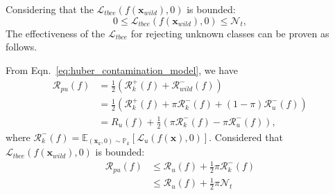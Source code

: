 
Considering that the $\mathcal{L}_{tbce}(f(\boldsymbol{x}_{wild}),0)$ is bounded:
\begin{equation}
    0 \leq \mathcal{L}_{tbce}(f(\boldsymbol{x}_{wild}),0) \leq \mathcal{N}_{t},
\end{equation}
The effectiveness of the $\mathcal{L}_{tbce}$ for rejecting unknown classes can be proven as follows.

\begin{IEEEproof}
    From Eqn.~\ref{eq:huber_contamination_model}, we have
    \begin{equation}\nonumber
        \begin{aligned}
            {\mathcal{R}_{pu}(f)} &= \frac{1}{2}\left({\mathcal{R}_{k}^{+}(f)}+{\mathcal{R}_{wild}^{-}(f)}\right)\\
                                  &= \frac{1}{2}\left({\mathcal{R}_{k}^{+}(f)}+{\pi}{\mathcal{R}_{k}^{-}(f)}+{(1-\pi)}{\mathcal{R}_{u}^{-}(f)}\right)\\
                                  &= {R_{u}(f)}+\frac{1}{2}\left({\pi}{\mathcal{R}_{k}^{-}(f)}-{\pi}{\mathcal{R}_{u}^{-}(f)}\right),
        \end{aligned}
    \end{equation}
    where $\mathcal{R}^{-}_{k}(f)=\mathbb{E}_{(\boldsymbol{x}_{k},0){\sim}{\mathbb{P}_{k}}}\left[\mathcal{L}_{u}(f(\boldsymbol{x}),0)\right]$. Considered that $\mathcal{L}_{tbce}(f(\boldsymbol{x}_{wild}),0)$ is bounded:
    \begin{equation}\nonumber
        \begin{aligned}
            {\mathcal{R}_{pu}(f)} &\leq {\mathcal{R}_{u}(f)}+\frac{1}{2}{\pi}{\mathcal{R}_{k}^{-}(f)}\\
                                  &\leq {\mathcal{R}_{u}(f)}+\frac{1}{2}{\pi}{\mathcal{N}_t}
        \end{aligned}
    \end{equation}


\end{IEEEproof}

